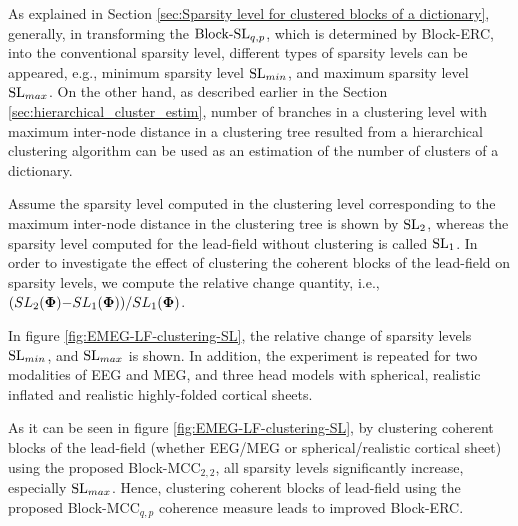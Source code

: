 As explained in Section \ref{sec:Sparsity level for clustered blocks of a dictionary}, generally, in transforming the $\mathrm{Block\text{{-}}SL}_{q,p}$, which is determined by Block-ERC, into the conventional sparsity level, different types of sparsity levels can be appeared, e.g., minimum sparsity level 
$\mathrm{SL}_{min}$, and maximum sparsity level 
$\mathrm{SL}_{max}$.
On the other hand, as described earlier in the Section \ref{sec:hierarchical_cluster_estim}, number of branches in a clustering level with maximum inter-node distance in a clustering tree resulted from a hierarchical clustering algorithm can be used as an estimation of the number of clusters of a dictionary.

Assume the sparsity level computed in the clustering level corresponding to the maximum inter-node distance in the clustering tree is shown by $\mathrm{SL}_2$, whereas the sparsity level computed for the lead-field without clustering is called $\mathrm{SL}_1$.
In order to investigate the effect of clustering the coherent blocks of the lead-field on sparsity levels, we compute the relative change quantity, i.e., $(SL_2(\boldsymbol{\Phi}) {-} SL_1(\boldsymbol{\Phi})) {/} SL_1(\boldsymbol{\Phi})$.

In figure \ref{fig:EMEG-LF-clustering-SL}, the relative change of sparsity levels $\mathrm{SL}_{min}$, and $\mathrm{SL}_{max}$ is shown.
In addition, the experiment is repeated for two modalities of EEG and MEG, and three head models with spherical, realistic inflated and realistic highly-folded cortical sheets.

As it can be seen in figure \ref{fig:EMEG-LF-clustering-SL}, by clustering coherent blocks of the lead-field (whether EEG/MEG or spherical/realistic cortical sheet) using the proposed Block-MCC$_{2,2}$, all sparsity levels significantly increase, especially $\mathrm{SL}_{max}$.
Hence, clustering coherent blocks of lead-field using the proposed Block-MCC$_{q,p}$ coherence measure leads to improved Block-ERC.


\FloatBarrier